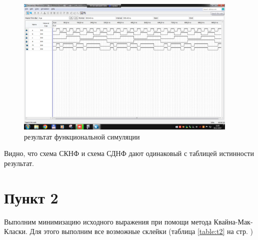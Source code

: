\documentclass[a4paper]{article}
\begin{document}
  \begin{figure}[H]
    \centering
    \includegraphics[width=0.9475\textwidth]{02_30}
    \caption{результат функциональной симуляции}
  \end{figure}

  Видно, что схема СКНФ и схема СДНФ дают одинаковый с таблицей истинности результат.

  \section*{Пункт 2}

  Выполним минимизацию исходного выражения при помощи метода Квайна-Мак-Класки. Для этого
  выполним все возможные склейки (таблица \ref{table:t2} на стр. \pageref{table:t2})
\end{document}
